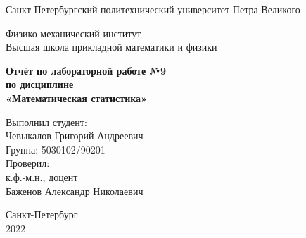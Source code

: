 \begin{titlepage}
	\newpage
	
	\begin{center}
		\textrm{\large Санкт-Петербургский политехнический университет \linebreak Петра Великого \\}
	\end{center}
	
	\begin{center}
		\textrm{\large Физико-механический институт \\ Высшая школа прикладной математики и физики \\}
	\end{center}

	\vspace{10em}
	
	\begin{center}
		\textrm{\textbf{\large Отчёт \linebreak по лабораторной работе №9 \\
				по дисциплине \\ «Математическая статистика»}}
	\end{center}
	
	\vspace{8em}
	
	\hfill\parbox{11cm}{
		\hspace*{4cm}Выполнил студент: \\
		\hspace*{4cm}Чевыкалов Григорий Андреевич \\
		\hspace*{4cm}Группа: 5030102/90201 \\
		\hspace*{4cm}Проверил: \\
		\hspace*{4cm}к.ф.-м.н., доцент \\
		\hspace*{4cm}Баженов Александр Николаевич \\
	}
	
	\vspace{\fill}
	
	\begin{center}
		Санкт-Петербург \\ 2022
	\end{center}
	
\end{titlepage}